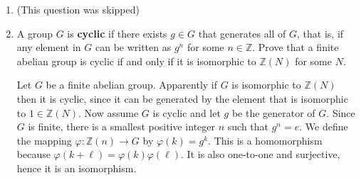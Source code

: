 \documentclass{article}
\begin{document}
\begin{enumerate}
\begin{enumerate}
\begin{solution}
            We note that we can define an inner product for periodic functions $f,g$ over $[0,1]$ on $\mathbb R$ as $(f,g)=\int_0^1 f\bar g$,
            then $\{e_n\}_{1\leq n\leq N}$ is orthonormal. We thus can have
            $$\int_0^1 \abs{P(x)}^2 dx = (P, P) = \sum_{j=1}^N \sum_{k=1}^N a_j\overline{a_k} (e_j, e_k) = \sum_{n=1}^N \abs{a_n}^2.$$

            Apply Parseval identity to $F$ and using the inner product for functions on $\mathbb Z(N)$, we have
            $$\sum_{n=1}^N \abs{a_n}^2 = (F,F) = \dfrac1N \sum_{x=1}^N  \abs{F(x)}^2 = \dfrac1N \sum_{x=1}^N \abs{P\left(\dfrac xN\right)}^2.$$
            This completes the proof.
        \end{solution}

        \item Prove the reconstruction formula
        $$P(x) = \sum_{j=1}^N P(j/N) K(x-(j/N))$$
        where 
        $$K(x) = \dfrac{e^{2\pi ix}}{N} \dfrac{1-e^{2\pi iNx}}{1-e^{2\pi ix}} = \dfrac1N (e^{2\pi ix} + e^{2\pi i2x} + \cdots + e^{2\pi iNx}).$$

        \begin{solution}
            For ease of notation, we let $e_k(x)=e^{2\pi ikx}$, and also $\xi=e^{2\pi i/N}$ to be the $N$-th root of unity. We have

            \begin{align}
                \text{RHS} &= \sum_{j=1}^N \sum_{n=1}^N a_n\xi^{nj} \cdot \dfrac1N \sum_{k=1}^N \dfrac{e_k(x)}{\xi^{kj}}\\
                &= \dfrac1N \sum_{n=1}^N\sum_{k=1}^N \left(\sum_{j=1}^N \xi^{(n-k)j}\right) a_ne_k(x)\\
                &= \sum_{n=1}^k a_n e_n(x) = P(x).
            \end{align}
        \end{solution}
    \end{enumerate}
    
    \item (This question was skipped)
    \item A group $G$ is \textbf{cyclic} if there exists $g\in G$ that generates all of $G$, that is, if any element in $G$ can be written
    as $g^n$ for some $n\in\mathbb Z$. Prove that a finite abelian group is cyclic if and only if it is isomorphic to $\mathbb Z(N)$
    for some $N$.

    \begin{solution}
        Let $G$ be a finite abelian group. Apparently if $G$ is isomorphic to $\mathbb Z(N)$ then it is cyclic, since it can be generated by
        the element that is isomorphic to $1\in\mathbb Z(N)$.
        Now assume $G$ is cyclic and let $g$ be the generator of $G$. Since $G$ is finite, there is a smallest positive integer $n$ such that
        $g^n=e$. We define the mapping $\varphi: \mathbb Z(n)\to G$ by $\varphi(k)=g^k$. This is a homomorphism because
        $\varphi(k+\ell)=\varphi(k)\varphi(\ell)$. It is also one-to-one and surjective, hence it is an isomorphism.
    \end{solution}


\end{enumerate}
\end{document}

